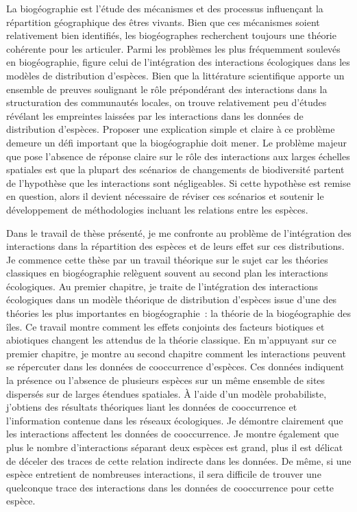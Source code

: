 La biogéographie est l'étude des mécanismes et des processus influençant
la répartition géographique des êtres vivants. Bien que ces mécanismes
soient relativement bien identifiés, les biogéographes recherchent
toujours une théorie cohérente pour les articuler. Parmi les problèmes
les plus fréquemment soulevés en biogéographie, figure celui de
l'intégration des interactions écologiques dans les modèles de
distribution d'espèces. Bien que la littérature scientifique apporte un
ensemble de preuves soulignant le rôle prépondérant des interactions
dans la structuration des communautés locales, on trouve relativement
peu d'études révélant les empreintes laissées par les interactions dans
les données de distribution d'espèces. Proposer une explication simple
et claire à ce problème demeure un défi important que la biogéographie
doit mener. Le problème majeur que pose l'absence de réponse claire sur
le rôle des interactions aux larges échelles spatiales est que la
plupart des scénarios de changements de biodiversité partent de
l'hypothèse que les interactions sont négligeables. Si cette hypothèse
est remise en question, alors il devient nécessaire de réviser ces
scénarios et soutenir le développement de méthodologies incluant les
relations entre les espèces.

Dans le travail de thèse présenté, je me confronte au problème de
l'intégration des interactions dans la répartition des espèces et de
leurs effet sur ces distributions. Je commence cette thèse par un
travail théorique sur le sujet car les théories classiques en
biogéographie relèguent souvent au second plan les interactions
écologiques. Au premier chapitre, je traite de l'intégration des
interactions écologiques dans un modèle théorique de distribution
d'espèces issue d'une des théories les plus importantes en
biogéographie~: la théorie de la biogéographie des îles. Ce travail
montre comment les effets conjoints des facteurs biotiques et abiotiques
changent les attendus de la théorie classique. En m'appuyant sur ce
premier chapitre, je montre au second chapitre comment les interactions
peuvent se répercuter dans les données de cooccurrence d'espèces. Ces
données indiquent la présence ou l'absence de plusieurs espèces sur un
même ensemble de sites dispersés sur de larges étendues spatiales. À
l'aide d'un modèle probabiliste, j'obtiens des résultats théoriques
liant les données de cooccurrence et l'information contenue dans les
réseaux écologiques. Je démontre clairement que les interactions
affectent les données de cooccurrence. Je montre également que plus le
nombre d'interactions séparant deux espèces est grand, plus il est
délicat de déceler des traces de cette relation indirecte dans les
données. De même, si une espèce entretient de nombreuses interactions,
il sera difficile de trouver une quelconque trace des interactions dans
les données de cooccurrence pour cette espèce.

